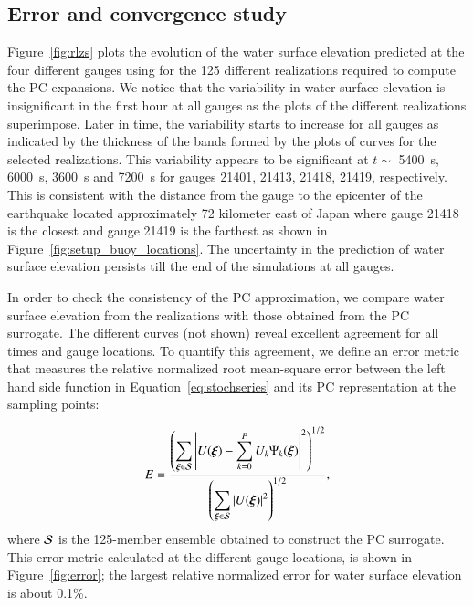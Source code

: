 \subsection{Error and convergence study}
\label{sec:analysis}

Figure~\ref{fig:rlzs} plots the evolution of the
water surface elevation predicted at the four different gauges 
using \geoclaw for the 125 different realizations 
required to compute the PC expansions. We notice that the 
variability in water surface elevation is insignificant in the first 
hour at all gauges as the plots of the different realizations superimpose.
Later in time, the variability starts to increase for all gauges 
as indicated by the thickness of the bands formed by the plots of curves for the selected realizations.
This variability appears to be significant at $t\sim$ 5400~s, 6000~s, 3600~s and 7200~s
for gauges 21401, 21413, 21418, 21419, respectively.
This is consistent with the distance from the gauge to the epicenter of the earthquake located approximately 72 kilometer east of Japan where gauge 21418 is the closest and gauge 21419 is the farthest as shown in Figure~\ref{fig:setup_buoy_locations}.
The uncertainty in the prediction of water surface  elevation persists till the end of the simulations
at all gauges.

In order to check the consistency of the PC approximation, we compare
water surface elevation from the realizations 
with those obtained from the PC surrogate. The different curves (not shown) 
reveal excellent agreement for all times and gauge locations.
To quantify this agreement, we define
an error metric that measures the relative normalized root mean-square error between the left hand side function 
in Equation~\eqref{eq:stochseries} and its PC representation at the sampling points:

\begin{equation} 
   E = \frac{\displaystyle
         \left(\sum_{\xxi \in \NISP} \left|U(\xxi) - \sum_{k = 0}^{P}
U_k\Psi_k(\xxi)\right|^2
         \right)^{1/2}}
        {\displaystyle
          \left(\sum_{\xxi \in \NISP} \left|U(\xxi)\right|^2\right)^{1/2} 
          },
\label{eq:error}
\end{equation}
where $\mathcal{S}$ is the 125-member ensemble obtained to construct the PC surrogate. 
This error metric calculated at the different gauge locations, is shown in Figure~\ref{fig:error};
the largest relative normalized error for 
water surface elevation is about 0.1\%. 

